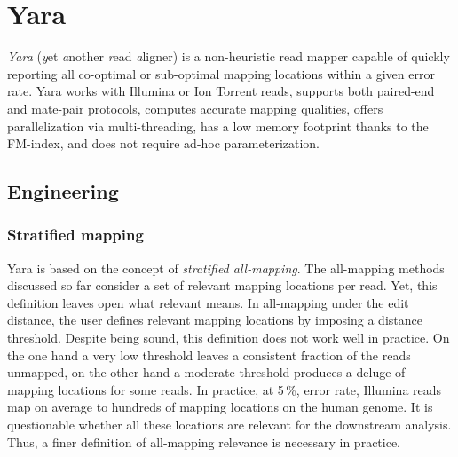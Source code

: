 \chapter{Yara}
\label{sec:yara}

\emph{Yara} (\emph{y}et \emph{a}nother \emph{r}ead \emph{a}ligner) is a non-heuristic read mapper capable of quickly reporting all co-optimal or sub-optimal mapping locations within a given error rate.
Yara works with Illumina or Ion Torrent reads, supports both paired-end and mate-pair protocols, computes accurate mapping qualities, offers parallelization via multi-threading, has a low memory footprint thanks to the FM-index, and does not require ad-hoc parameterization.


\section{Engineering}
\label{sec:yara:eng}

\subsection{Stratified mapping}
\label{sec:yara:eng:strata}

Yara is based on the concept of \emph{stratified all-mapping}.
The all-mapping methods discussed so far consider a set of relevant mapping locations per read.
Yet, this definition leaves open what relevant means.
In all-mapping under the edit distance, the user defines relevant mapping locations by imposing a distance threshold.
Despite being sound, this definition does not work well in practice.
On the one hand a very low threshold leaves a consistent fraction of the reads unmapped, on the other hand a moderate threshold produces a deluge of mapping locations for some reads.
In practice, at 5\,\%, error rate, Illumina reads map on average to hundreds of mapping locations on the human genome.
It is questionable whether all these locations are relevant for the downstream analysis.
Thus, a finer definition of all-mapping relevance is necessary in practice.


